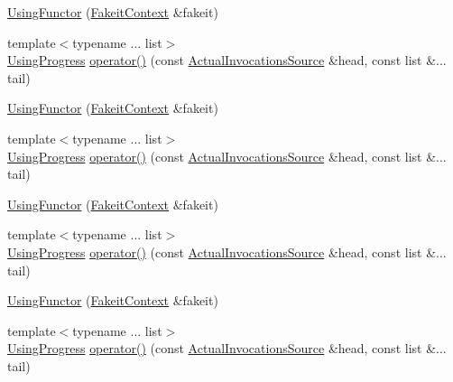 \begin{DoxyCompactItemize}
\item 
\mbox{\hyperlink{classfakeit_1_1UsingFunctor_ab7ed9b94b7e7c0fe306f12a2f33d1b64}{Using\+Functor}} (\mbox{\hyperlink{structfakeit_1_1FakeitContext}{Fakeit\+Context}} \&fakeit)
\item 
{\footnotesize template$<$typename ... list$>$ }\\\mbox{\hyperlink{classfakeit_1_1UsingProgress}{Using\+Progress}} \mbox{\hyperlink{classfakeit_1_1UsingFunctor_ac93b365a3185f144cd88bb3f38864fb5}{operator()}} (const \mbox{\hyperlink{structfakeit_1_1ActualInvocationsSource}{Actual\+Invocations\+Source}} \&head, const list \&... tail)
\item 
\mbox{\hyperlink{classfakeit_1_1UsingFunctor_ab7ed9b94b7e7c0fe306f12a2f33d1b64}{Using\+Functor}} (\mbox{\hyperlink{structfakeit_1_1FakeitContext}{Fakeit\+Context}} \&fakeit)
\item 
{\footnotesize template$<$typename ... list$>$ }\\\mbox{\hyperlink{classfakeit_1_1UsingProgress}{Using\+Progress}} \mbox{\hyperlink{classfakeit_1_1UsingFunctor_ac93b365a3185f144cd88bb3f38864fb5}{operator()}} (const \mbox{\hyperlink{structfakeit_1_1ActualInvocationsSource}{Actual\+Invocations\+Source}} \&head, const list \&... tail)
\item 
\mbox{\hyperlink{classfakeit_1_1UsingFunctor_ab7ed9b94b7e7c0fe306f12a2f33d1b64}{Using\+Functor}} (\mbox{\hyperlink{structfakeit_1_1FakeitContext}{Fakeit\+Context}} \&fakeit)
\item 
{\footnotesize template$<$typename ... list$>$ }\\\mbox{\hyperlink{classfakeit_1_1UsingProgress}{Using\+Progress}} \mbox{\hyperlink{classfakeit_1_1UsingFunctor_ac93b365a3185f144cd88bb3f38864fb5}{operator()}} (const \mbox{\hyperlink{structfakeit_1_1ActualInvocationsSource}{Actual\+Invocations\+Source}} \&head, const list \&... tail)
\item 
\mbox{\hyperlink{classfakeit_1_1UsingFunctor_ab7ed9b94b7e7c0fe306f12a2f33d1b64}{Using\+Functor}} (\mbox{\hyperlink{structfakeit_1_1FakeitContext}{Fakeit\+Context}} \&fakeit)
\item 
{\footnotesize template$<$typename ... list$>$ }\\\mbox{\hyperlink{classfakeit_1_1UsingProgress}{Using\+Progress}} \mbox{\hyperlink{classfakeit_1_1UsingFunctor_ac93b365a3185f144cd88bb3f38864fb5}{operator()}} (const \mbox{\hyperlink{structfakeit_1_1ActualInvocationsSource}{Actual\+Invocations\+Source}} \&head, const list \&... tail)
\item 

\end{DoxyCompactItemize}
